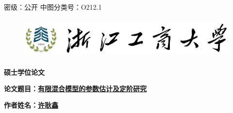 \documentclass[a4paper,12pt,openany,oneside,utf-8]{ctexbook}
\newcommand{\chuhao}{\fontsize{48pt}{\baselineskip}\selectfont}
\newcommand{\sanhao}{\fontsize{15.75pt}{\baselineskip}\selectfont}
\newcommand{\xiaowuhao}{\fontsize{9pt}{\baselineskip}\selectfont}
\begin{document}
\theoremstyle{plain} \theoremseparator{}
 \theoremsymbol{}%



\fancypagestyle{plain}{%
\fancyhead{} %
\fancyhead[CE,CO]{\xiaowuhao{}}} %
\begin{titlepage}
\fancyhead[C]{\xiaowuhao} %
\vskip 4mm
\xiaowuhao 密级：公开 \hspace{9cm}中图分类号：O212.1

\vskip 6mm

\begin{figure}[htbp]
\centering
\includegraphics[width=140mm,height=22mm]{zjgsu.jpg}
\end{figure}

\vskip 10mm

\begin{spacing}{1.0}
\begin{center}
\chuhao\textbf{硕士学位论文}
\end{center}

\vskip 20mm
\begin{center}
\hspace{0.01mm}\sanhao\textbf{论文题目：\underline{有限混合模型的参数估计及定阶研究}}
\end{center}
\end{spacing}
\vspace{24mm}

\begin{center}
\textbf{\kaishu\sanhao 作者姓名：\underline{\quad \quad \quad 许耿鑫 \quad \quad \quad \quad}}
\end{center}



\end{titlepage}
\end{document}
